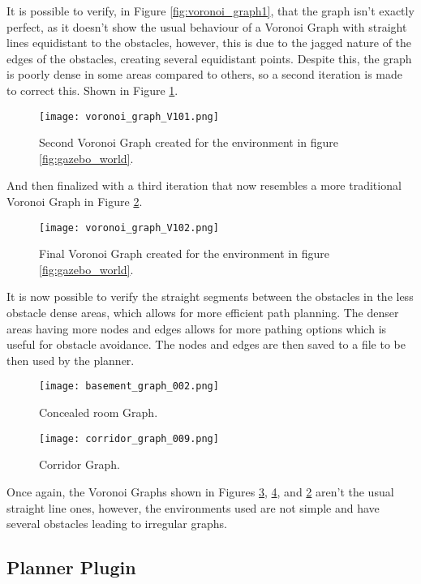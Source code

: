 It is possible to verify, in Figure \ref{fig:voronoi_graph1}, that the graph isn't exactly perfect, as it doesn't 
show the usual behaviour of a Voronoi Graph with straight lines equidistant to the 
obstacles, however, this is due to the jagged nature of the edges of the obstacles, creating 
several equidistant points. Despite this, the graph is poorly dense in some 
areas compared to others, so a second iteration is made to correct this. Shown in Figure \ref{fig:voronoi_graph2}.
\begin{figure}[h]
    \centering
    \texttt{[image: voronoi\_graph\_V101.png]}
    \caption{Second Voronoi Graph created for the environment in figure \ref{fig:gazebo_world}.}
    \label{fig:voronoi_graph2}
\end{figure}

And then finalized with a third iteration that now resembles a more 
traditional Voronoi Graph in Figure \ref{fig:voronoi_graph3}.
\begin{figure}[h]
    \centering
    \texttt{[image: voronoi\_graph\_V102.png]}
    \caption{Final Voronoi Graph created for the environment in figure \ref{fig:gazebo_world}.}
    \label{fig:voronoi_graph3}
\end{figure}

It is now possible to verify the straight segments between the obstacles in the 
less obstacle dense areas, which allows for more efficient path planning. The denser areas 
having more nodes and edges allows for more pathing options which is useful 
for obstacle avoidance. The nodes and edges are then saved to a file to be 
then used by the planner.
\begin{figure}[h]
    \centering
    \texttt{[image: basement\_graph\_002.png]}
    \caption{Concealed room Graph.}
    \label{fig:basement_graph_002}
\end{figure}
\begin{figure}[h]
    \centering
    \texttt{[image: corridor\_graph\_009.png]}
    \caption{Corridor Graph.}
    \label{fig:corridor_graph_009}
\end{figure}
\clearpage

Once again, the Voronoi Graphs shown in Figures \ref{fig:basement_graph_002}, \ref{fig:corridor_graph_009}, and \ref{fig:voronoi_graph3} aren't the usual straight line ones, however, the environments 
used are not simple and have several obstacles leading to irregular graphs.

\subsection{Planner Plugin}
\label{subsec:planner_plugin}
